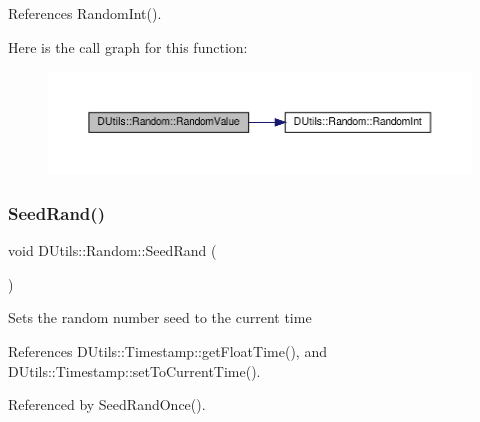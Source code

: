 References Random\+Int().

Here is the call graph for this function\+:\nopagebreak
\begin{figure}[H]
\begin{center}
\leavevmode
\includegraphics[width=350pt]{classDUtils_1_1Random_a13760f5d6d4b866fbcc350dbb0d39d02_cgraph}
\end{center}
\end{figure}
\mbox{\label{classDUtils_1_1Random_a719a6489316343a771e062f0be58050f}} 
\subsubsection{\texorpdfstring{Seed\+Rand()}{SeedRand()}\hspace{0.1cm}{\footnotesize\ttfamily [1/2]}}
{\footnotesize\ttfamily void D\+Utils\+::\+Random\+::\+Seed\+Rand (\begin{DoxyParamCaption}{ }\end{DoxyParamCaption})\hspace{0.3cm}{\ttfamily [static]}}

Sets the random number seed to the current time 

References D\+Utils\+::\+Timestamp\+::get\+Float\+Time(), and D\+Utils\+::\+Timestamp\+::set\+To\+Current\+Time().



Referenced by Seed\+Rand\+Once().

